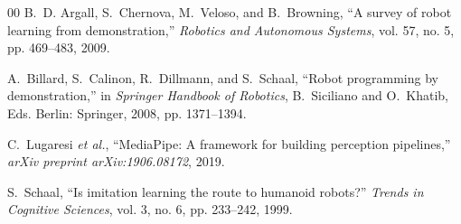 \documentclass[conference,10pt,twocolumn]{IEEEtran}
\begin{document}

\begin{thebibliography}{00}
B.~D. Argall, S.~Chernova, M.~Veloso, and B.~Browning, ``A survey of robot learning from demonstration,'' \textit{Robotics and Autonomous Systems}, vol. 57, no. 5, pp. 469--483, 2009.

A.~Billard, S.~Calinon, R.~Dillmann, and S.~Schaal, ``Robot programming by demonstration,'' in \textit{Springer Handbook of Robotics}, B.~Siciliano and O.~Khatib, Eds. Berlin: Springer, 2008, pp. 1371--1394.

C.~Lugaresi \textit{et al.}, ``MediaPipe: A framework for building perception pipelines,'' \textit{arXiv preprint arXiv:1906.08172}, 2019.

S.~Schaal, ``Is imitation learning the route to humanoid robots?'' \textit{Trends in Cognitive Sciences}, vol. 3, no. 6, pp. 233--242, 1999.
\end{thebibliography}
\end{document}
